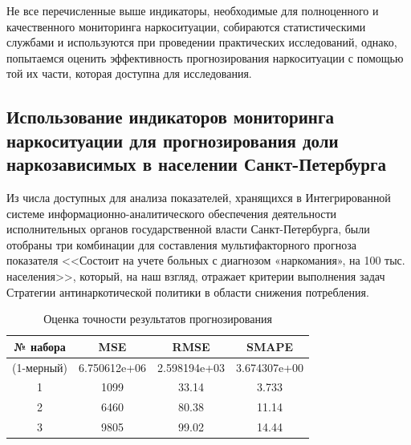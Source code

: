 Не все перечисленные выше индикаторы, необходимые для полноценного и 
качественного мониторинга наркоситуации, собираются статистическими службами 
и используются при проведении практических исследований, однако, попытаемся 
оценить эффективность прогнозирования наркоситуации с помощью той их части, 
которая доступна для исследования.

\subsection{Использование индикаторов мониторинга наркоситуации для 
    прогнозирования доли наркозависимых в населении Санкт-Петербурга}

Из числа доступных для анализа показателей, хранящихся в Интегрированной системе 
информационно-аналитического обеспечения деятельности исполнительных органов 
государственной власти Санкт-Петербурга, были отобраны три комбинации для 
составления мультифакторного прогноза показателя <<Состоит на учете больных с 
диагнозом «наркомания», на 100 тыс. населения>>, который, на наш взгляд, 
отражает критерии выполнения задач Стратегии антинаркотической политики в 
области снижения потребления.

\begin{table}[bhtp]
    \caption{Оценка точности результатов прогнозирования}
    \begin{tabular}{ | c | c | c | c | }
        \hline
        № набора & MSE & RMSE & SMAPE \\
        \hline
        (1-мерный) & 6.750612e+06 & 2.598194e+03 & 3.674307e+00  \\
        \hline
        1 & 1099 & 33.14 & 3.733  \\
        \hline
        2 & 6460 & 80.38 & 11.14  \\
        \hline
        3 & 9805 & 99.02 & 14.44  \\
        \hline
    \end{tabular}		
    \label{table:WM-error-multi}	
\end{table}

